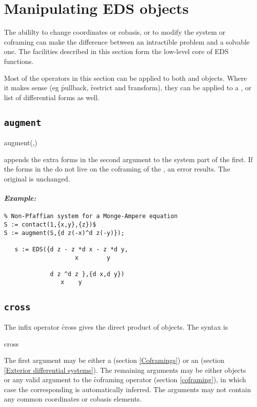\section{Manipulating EDS objects}
\label{Manipulating EDS objects}

The abililty to change coordinates or cobasis, or to modify the system or
coframing can make the difference between an intractible problem and a
solvable one. The facilities described in this section form the low-level
core of EDS functions.

Most of the operators in this section can be applied to both  and
 objects. Where it makes sense (eg \f{pullback},
\f{restrict} and \f{transform}), they can be applied to a , or
list of differential forms as well.

\subsection{\tt augment}
\label{augment}

\begin{syntax}
	augment(,)
\end{syntax}
appends the extra forms in the second argument to the system part of the
first. If the forms in the  do not live on the coframing of the
, an error results. The original  is unchanged.

\paragraph{\it Example:}
\begin{verbatim}
% Non-Pfaffian system for a Monge-Ampere equation
S := contact(1,{x,y},{z})$
S := augment(S,{d z(-x)^d z(-y)});

   s := EDS({d z - z *d x - z *d y,
                    x        y 

             d z ^d z },{d x,d y})
                x    y 
\end{verbatim}

\subsection{\tt cross}
\label{cross}

The infix operator \f{cross} gives the direct product of
 objects. The syntax is
\begin{syntax}
	 cross  
\end{syntax}
The first argument may be either a  (section
\ref{Coframings}) or an  (section \ref{Exterior differential
systems}). The remaining arguments may be either 
objects or any valid argument to the \f{coframing} operator (section
\ref{coframing}), in which case the corresponding  is
automatically inferred. The arguments may not contain any common
coordinates or cobasis elements.

